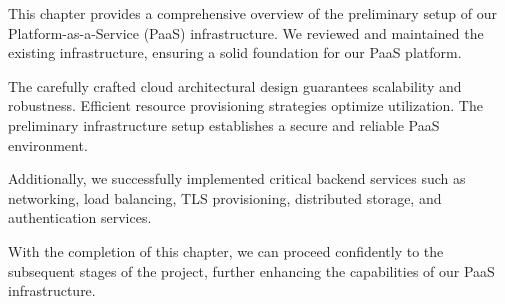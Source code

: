 \hspace{7mm}This chapter provides a comprehensive overview of the preliminary setup of our Platform-as-a-Service (PaaS) infrastructure. We reviewed and maintained the existing infrastructure, ensuring a solid foundation for our PaaS platform.

\hspace{7mm}The carefully crafted cloud architectural design guarantees scalability and robustness. Efficient resource provisioning strategies optimize utilization. The preliminary infrastructure setup establishes a secure and reliable PaaS environment. 

\hspace{7mm}Additionally, we successfully implemented critical backend services such as networking, load balancing, TLS provisioning, distributed storage, and authentication services.

\hspace{7mm}With the completion of this chapter, we can proceed confidently to the subsequent stages of the project, further enhancing the capabilities of our PaaS infrastructure.